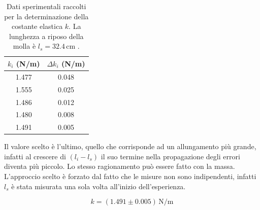 \documentclass[a4paper,12pt]{article}
\begin{document}
\begin{table}[htbp]
\centering
\caption{Dati sperimentali raccolti per la determinazione della costante elastica $k$. La lunghezza a riposo della molla è $l_s = 32.4\,\text{cm}$ .}
\label{tab:dati_molla}
\begin{tabular}{cc}
\toprule
$k_i$ (N/m) & $\Delta k_i$ (N/m) \\
\midrule
1.477 & 0.048 \\
1.555 & 0.025 \\
1.486 & 0.012 \\
1.480 & 0.008 \\
1.491 & 0.005 \\
\bottomrule
\end{tabular}
\end{table}

Il valore scelto è l'ultimo, quello che corrisponde ad un allungamento più grande, infatti al crescere di $(l_i - l_s)$ il suo termine nella propagazione degli errori diventa più piccolo.
Lo stesso ragionamento può essere fatto con la massa.
L'approccio scelto è forzato dal fatto che le misure non sono indipendenti, infatti $l_s$ è stata misurata una sola volta all'inizio dell'esperienza.

$$k = (1.491 \pm 0.005)\,\text{N/m}$$
\end{document}
